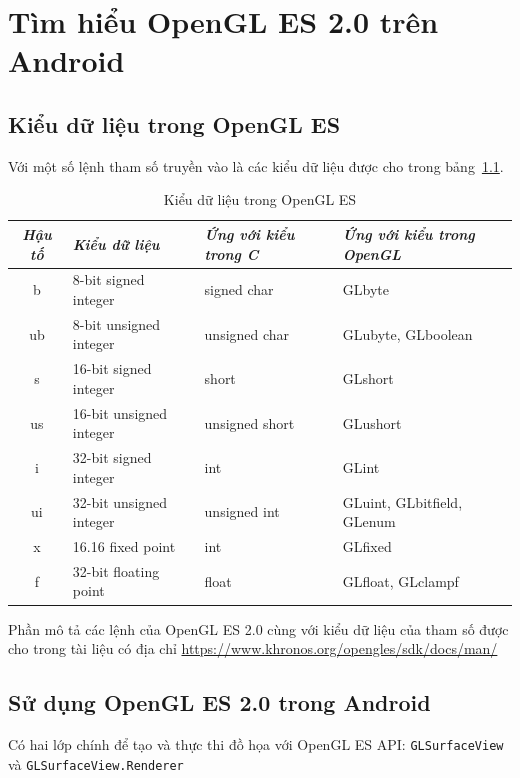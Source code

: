 \documentclass[13pt,a4paper]{extreport}
\begin{document}
\chapter{Tìm hiểu OpenGL ES 2.0 trên Android}
\section{Kiểu dữ liệu trong OpenGL ES}
	Với một số lệnh tham số truyền vào là các kiểu dữ liệu được cho trong bảng~\ref{Tab:kieudulieu-opengles}.
	\begin{table}[!h]
		\begin{center}
			\begin{tabular}{|c|l|l|l|}\hline
				\textit{Hậu tố} & \textit{Kiểu dữ liệu} & \textit{Ứng với kiểu trong C} & \textit{Ứng với kiểu trong OpenGL}\\ \hline
				b & 8-bit signed integer & signed char & GLbyte \\ \hline
				ub & 8-bit unsigned integer & unsigned char & GLubyte, GLboolean \\ \hline
				s & 16-bit signed integer & short & GLshort \\ \hline
				us & 16-bit unsigned integer & unsigned short & GLushort \\ \hline
				i & 32-bit signed integer & int & GLint \\ \hline
				ui & 32-bit unsigned integer & unsigned int & GLuint, GLbitfield, GLenum \\ \hline
				x & 16.16 fixed point & int & GLfixed \\ \hline
				f & 32-bit floating point & float & GLfloat, GLclampf \\ \hline
			\end{tabular}
		\end{center}
		\caption{Kiểu dữ liệu trong OpenGL ES}
		\label{Tab:kieudulieu-opengles}
	\end{table}
	
	Phần mô tả các lệnh của OpenGL ES 2.0 cùng với kiểu dữ liệu của tham số được cho trong tài liệu có địa chỉ \url{https://www.khronos.org/opengles/sdk/docs/man/}
\section{Sử dụng OpenGL ES 2.0 trong Android}
Có hai lớp chính để tạo và thực thi đồ họa với OpenGL ES API: \verb|GLSurfaceView| và \verb|GLSurfaceView.Renderer|
	
\end{document}
